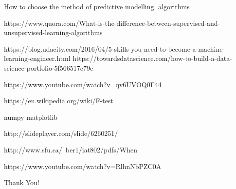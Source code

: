 \documentclass{beamer}
\begin{document}
\begin{frame}
	How to choose the method of predictive modelling.
	algorithms

	https://www.quora.com/What-is-the-difference-between-supervised-and-unsupervised-learning-algorithms
	
	https://blog.udacity.com/2016/04/5-skills-you-need-to-become-a-machine-learning-engineer.html
	https://towardsdatascience.com/how-to-build-a-data-science-portfolio-5f566517c79c
		
	https://www.youtube.com/watch?v=qv6UVOQ0F44
	
	https://en.wikipedia.org/wiki/F-test
	
	numpy matplotlib
	
	http://slideplayer.com/slide/6260251/
	
	http://www.sfu.ca/~ber1/iat802/pdfs/When%
	
	https://www.youtube.com/watch?v=RlhnNbPZC0A
\end{frame}



\begin{frame}

\end{frame}

\begin{frame}
	Thank You!
\end{frame}
\end{document}
